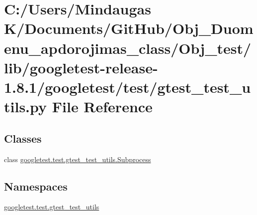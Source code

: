 \hypertarget{_obj__test_2lib_2googletest-release-1_88_81_2googletest_2test_2gtest__test__utils_8py}{}\section{C\+:/\+Users/\+Mindaugas K/\+Documents/\+Git\+Hub/\+Obj\+\_\+\+Duomenu\+\_\+apdorojimas\+\_\+class/\+Obj\+\_\+test/lib/googletest-\/release-\/1.8.1/googletest/test/gtest\+\_\+test\+\_\+utils.py File Reference}
\label{_obj__test_2lib_2googletest-release-1_88_81_2googletest_2test_2gtest__test__utils_8py}
\subsection*{Classes}
\begin{DoxyCompactItemize}
\item 
class \mbox{\hyperlink{classgoogletest_1_1test_1_1gtest__test__utils_1_1_subprocess}{googletest.\+test.\+gtest\+\_\+test\+\_\+utils.\+Subprocess}}
\end{DoxyCompactItemize}
\subsection*{Namespaces}
\begin{DoxyCompactItemize}
\item 
 \mbox{\hyperlink{namespacegoogletest_1_1test_1_1gtest__test__utils}{googletest.\+test.\+gtest\+\_\+test\+\_\+utils}}
\end{DoxyCompactItemize}
